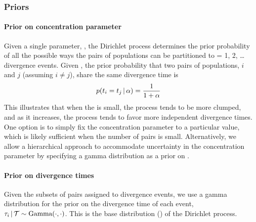 \subsubsection{Priors}


\paragraph{Prior on concentration parameter}
Given a single parameter, \concentration, the Dirichlet process determines the
prior probability of all the possible ways the \ncomparisons pairs of
populations can be partitioned to \nevents = 1, 2, \ldots \ncomparisons
divergence events.
Given \concentration, the prior probability that two pairs of populations, $i$
and $j$ (assuming $i \neq j$), share the same divergence time is
\begin{equation}
    \pr(\comparisondivtime[i] = \comparisondivtime[j] \given \concentration)
    =
    \frac{1}{1 + \concentration}
\end{equation}
This illustrates that when the \concentration is small, the process tends to be
more clumped, and as it increases, the process tends to favor more independent
divergence times.
One option is to simply fix the concentration parameter to a particular value,
which is likely sufficient when the number of pairs is small.
Alternatively, we allow a hierarchical approach to accommodate uncertainty in
the concentration parameter by specifying a gamma distribution as a prior on
\concentration \citep{Escobar1995,Heath2011}.

\paragraph{Prior on divergence times}
Given the subsets of pairs assigned to divergence events, we use a gamma
distribution for the prior on the divergence time of each event,
$\divtime[i] \given \divtimesets \sim \distgamma(\cdot, \cdot)$.
This is the base distribution (\basedistribution) of the Dirichlet process.

